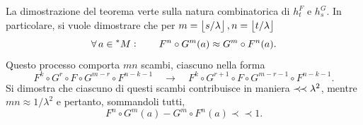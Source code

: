 \documentclass{beamer}
\begin{document}
\begin{frame}
    
La dimostrazione del teorema verte sulla natura combinatorica di $ h^{F}_t $ e $ h_{s}^{G}  $. In particolare, si vuole dimostrare che per $ m=\left\lfloor s/\lambda \right\rfloor, n=\left\lfloor t/\lambda \right\rfloor $\begin{equation*}
    \forall\, a  \in \prescript{*}{}{M}: \qquad F^{n}\circ G^{m}(a)\approx G^{m}\circ F^{n}(a).
\end{equation*}Questo processo comporta $ mn $ scambi, ciascuno nella forma \begin{equation*}
    F^{k}\circ G^{r}\circ F \circ G^{m-r}\circ F^{n-k-1} \quad \longrightarrow \quad F^{k}\circ G^{r+1}\circ F\circ G^{m-r-1} \circ F^{n-k-1}.
\end{equation*}Si dimostra che ciascuno di questi scambi contribuisce in maniera $ \mathrel{\prec\! \prec} \lambda^{2} $, mentre $ mn \approx 1/\lambda^{2} $ e pertanto, sommandoli tutti, \begin{equation*}
    F^{n}\circ G^{m}(a)-G^{m}\circ F^{n}(a)\prec \prec 1.
\end{equation*}

\end{frame}
\end{document}
